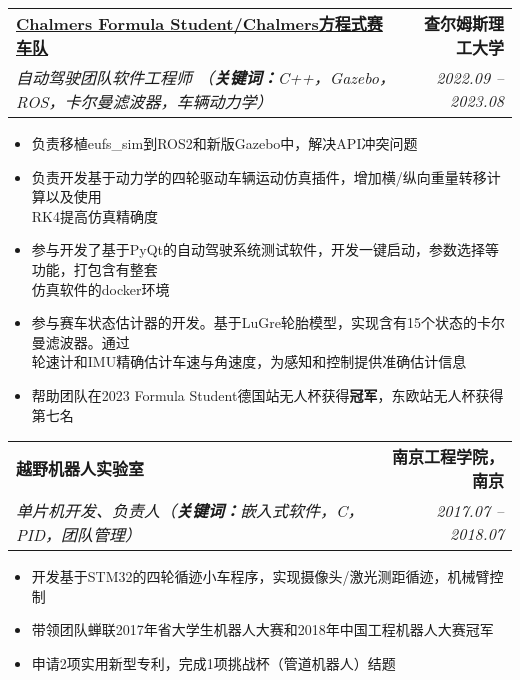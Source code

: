 \documentclass[letterpaper,11pt]{article}
\makeatletter
\newcommand{\resumeItem}[1]{
  \item\small{
    {#1 \vspace{-2pt}}
  }
}
\newcommand{\resumeSubheading}[4]{
  \vspace{-2pt}\item\small{
    \begin{tabular*}{0.97\textwidth}[t]{l@{\extracolsep{\fill}}r}
      \textbf{#1} & \textbf{#2} \\
      \textit{#3} & \textit{#4} \\
    \end{tabular*}\vspace{-7pt}
  }
}
\newcommand{\resumeItemListStart}{\begin{itemize}}
\newcommand{\resumeItemListEnd}{\end{itemize}\vspace{-5pt}}
\makeatother
\begin{document}
    \resumeSubheading
  {\href{https://www.chalmersformulastudent.se/cfs-2023-car-margareta}{Chalmers Formula Student/Chalmers方程式赛车队 \faExternalLink}}{查尔姆斯理工大学}
    {自动驾驶团队软件工程师 （\textbf{关键词：}C++，Gazebo，ROS，卡尔曼滤波器，车辆动力学）}{2022.09 -- 2023.08}
    \resumeItemListStart
      \resumeItem{负责移植eufs\_sim到ROS2和新版Gazebo中，解决API冲突问题}
      \resumeItem{负责开发基于动力学的四轮驱动车辆运动仿真插件，增加横/纵向重量转移计算以及使用 \\ RK4提高仿真精确度}
      \resumeItem{参与开发了基于PyQt的自动驾驶系统测试软件，开发一键启动，参数选择等功能，打包含有整套 \\ 仿真软件的docker环境}
      \resumeItem{参与赛车状态估计器的开发。基于LuGre轮胎模型，实现含有15个状态的卡尔曼滤波器。通过 \\ 轮速计和IMU精确估计车速与角速度，为感知和控制提供准确估计信息}
      \resumeItem{帮助团队在2023 Formula Student德国站无人杯获得\textbf{冠军}，东欧站无人杯获得第七名}
  \resumeItemListEnd


    
  \resumeSubheading
    {越野机器人实验室}{南京工程学院，南京}
    {单片机开发、负责人（\textbf{关键词：}嵌入式软件，C，PID，团队管理）}{2017.07 -- 2018.07}
    \resumeItemListStart
      \resumeItem{开发基于STM32的四轮循迹小车程序，实现摄像头/激光测距循迹，机械臂控制}
      \resumeItem{带领团队蝉联2017年省大学生机器人大赛和2018年中国工程机器人大赛冠军}
      \resumeItem{申请2项实用新型专利，完成1项挑战杯（管道机器人）结题}
      \resumeItemListEnd
\end{document}
